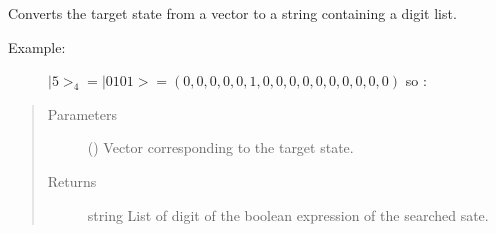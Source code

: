 \documentclass[letterpaper,10pt,english]{sphinxmanual}
\begin{document}
\begin{fulllineitems}
\label{\detokenize{grover:grover.target_state_ket_vector_to_string}}
Converts the target state from a vector to a string containing a digit list.
\begin{description}
\item[{Example:}] \leavevmode
\(|5>_4 = |0101> = (0, 0, 0, 0, 0, 1, 0, 0, 0, 0, 0, 0, 0, 0, 0, 0)\) so :

%
\begin{sphinxVerbatim}[commandchars=\\\{\},formatcom=\footnotesize]
                 
\end{sphinxVerbatim}

\end{description}
\begin{quote}\begin{description}
\item[{Parameters}] \leavevmode
{} () \textendash{} Vector corresponding to the target state.

\item[{Returns}] \leavevmode
string \textendash{} List of digit of the boolean expression of the searched 
sate.

\end{description}\end{quote}

\end{fulllineitems}

\end{document}
